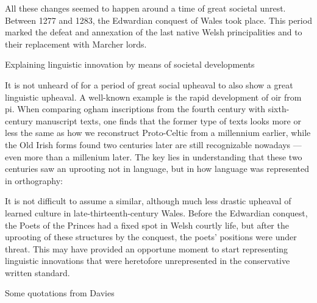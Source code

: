 All these changes seemed to happen around a time of great societal unrest. Between 1277 and 1283, the Edwardian conquest of Wales took place. This period marked the defeat and annexation of the last native Welsh principalities and to their replacement with Marcher lords.

Explaining linguistic innovation by means of societal developments 

It is not unheard of for a period of great social upheaval to also show a great linguistic upheaval. A well-known example is the rapid development of \gls{oir} from \gls{pi}. When comparing ogham inscriptions from the fourth century with sixth-century manuscript texts, one finds that the former type of texts looks more or less the same as how we reconstruct Proto-Celtic from a millennium earlier, while the Old Irish forms found two centuries later are still recognizable nowadays --- even more than a millenium later. The key lies in understanding that these two centuries saw an uprooting not in language, but in how language was represented in orthography:

It is not difficult to assume a similar, although much less drastic upheaval of learned culture in late-thirteenth-century Wales. Before the Edwardian conquest, the Poets of the Princes had a fixed spot in Welsh courtly life, but after the uprooting of these structures by the conquest, the poets' positions were under threat. This may have provided an opportune moment to start representing linguistic innovations that were heretofore unrepresented in the conservative written standard. 

Some quotations from Davies


